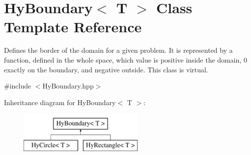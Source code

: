 \hypertarget{classHyBoundary}{
\section{HyBoundary$<$ T $>$ Class Template Reference}
\label{classHyBoundary}
}


Defines the border of the domain for a given problem. It is represented by a function, defined in the whole space, which value is positive inside the domain, 0 exactly on the boundary, and negative outside. This class is virtual.  




{\ttfamily \#include $<$HyBoundary.hpp$>$}

Inheritance diagram for HyBoundary$<$ T $>$:\begin{figure}[H]
\begin{center}
\leavevmode
\includegraphics[height=2cm]{classHyBoundary}
\end{center}
\end{figure}
